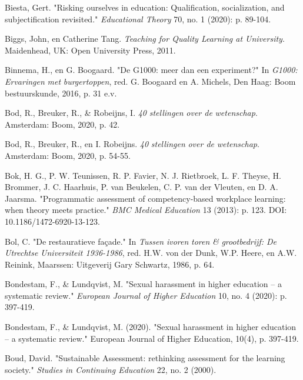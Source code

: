 \documentclass[smallauthor, chapterhaspagenum, nochapterinheader, pagenuminheader,  bigchapnum,medium2, tocpages,  garamond, titleinheader]{jote-book}
\begin{document}
\begin{references}
		Biesta, Gert. "Risking ourselves in education: Qualification, socialization, and subjectification revisited." \emph{Educational Theory} 70, no. 1 (2020): p. 89-104.



		Biggs, John, en Catherine Tang. \emph{Teaching for Quality Learning at University}. Maidenhead, UK: Open University Press, 2011.



		Binnema, H., en G. Boogaard. "De G1000: meer dan een experiment?" In \emph{G1000: }\emph{Ervaringen}\emph{ met }\emph{burgertoppen}, red. G. Boogaard en A. Michels, Den Haag: Boom bestuurskunde, 2016, p. 31 e.v.



		Bod, R., Breuker, R., \& Robeijns, I. \emph{40 }\emph{stellingen}\emph{ over de }\emph{wetenschap}. Amsterdam: Boom, 2020, p. 42.



		Bod, R., Breuker, R., en I. Robeijns. \emph{40 }\emph{stellingen}\emph{ over de }\emph{wetenschap}. Amsterdam: Boom, 2020, p. 54-55.



		Bok, H. G., P. W. Teunissen, R. P. Favier, N. J. Rietbroek, L. F. Theyse, H. Brommer, J. C. Haarhuis, P. van Beukelen, C. P. van der Vleuten, en D. A. Jaarsma. "Programmatic assessment of competency-based workplace learning: when theory meets practice." \emph{BMC Medical Education} 13 (2013): p. 123. DOI: 10.1186/1472-6920-13-123.



		Bol, C. "De restauratieve façade." In \emph{Tussen}\emph{ }\emph{ivoren}\emph{ }\emph{toren}\emph{ \& }\emph{grootbedrijf}\emph{: De }\emph{Utrechtse}\emph{ Universiteit 1936-1986}, red. H.W. von der Dunk, W.P. Heere, en A.W. Reinink, Maarssen: Uitgeverij Gary Schwartz, 1986, p. 64.



		Bondestam, F., \& Lundqvist, M. "Sexual harassment in higher education -- a systematic review." \emph{European Journal of Higher Education} 10, no. 4 (2020): p. 397-419.



		Bondestam, F., \& Lundqvist, M. (2020). "Sexual harassment in higher education -- a systematic review." European Journal of Higher Education, 10(4), p. 397-419.



		Boud, David. "Sustainable Assessment: rethinking assessment for the learning society." \emph{Studies in Continuing Education} 22, no. 2 (2000).




\end{references}
\end{document}
